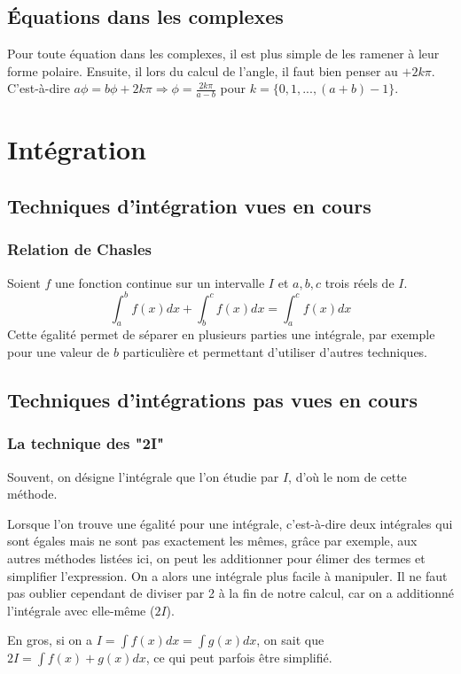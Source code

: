 \documentclass[10pt,a4paper]{book}
\begin{document}
\section{Équations dans les complexes}
Pour toute équation dans les complexes, il est plus simple de les ramener à leur forme polaire. Ensuite, il lors du calcul de l'angle, il faut bien penser au $+2k\pi$. C'est-à-dire $a\phi = b\phi +2k\pi \Rightarrow \phi = \frac{2k\pi}{a-b}$ pour $k=\{0,1,...,(a+b)-1\}$.

\chapter{Intégration}
\section{Techniques d'intégration vues en cours}
\subsection{Relation de Chasles}
Soient $f$ une fonction continue sur un intervalle $I$ et $a,b,c$ trois réels de $I$.
\[\int^b_af(x)dx + \int^c_bf(x)dx = \int^c_af(x)dx\]
Cette égalité permet de séparer en plusieurs parties une intégrale, par exemple pour une valeur de $b$ particulière et permettant d'utiliser d'autres techniques.

\section{Techniques d'intégrations pas vues en cours}
\subsection{La technique des "2I"}
Souvent, on désigne l'intégrale que l'on étudie par $I$, d'où le nom de cette méthode.\par 
Lorsque l'on trouve une égalité pour une intégrale, c'est-à-dire deux inté\-grales qui sont égales mais ne sont pas exactement les mêmes, grâce par exemple, aux autres méthodes listées ici, on peut les additionner pour élimer des termes et simplifier l'expression. On a alors une intégrale plus facile à manipuler. Il ne faut pas oublier cependant de diviser par 2 à la fin de notre calcul, car on a additionné l'intégrale avec elle-même ($2I$).\par 
En gros, si on a $I=\int f(x)dx = \int g(x)dx$, on sait que $2I = \int f(x)+g(x)dx$, ce qui peut parfois être simplifié.
\end{document}

